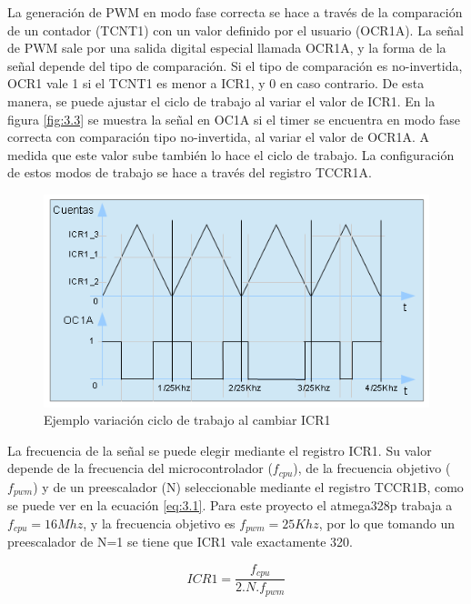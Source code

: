 La generación de PWM en modo fase correcta se hace a través de la comparación de un contador (TCNT1) con un valor definido por el usuario (OCR1A). La señal de PWM sale por una salida digital especial llamada OCR1A, y la forma de la señal depende del tipo de comparación. Si el tipo de comparación es no-invertida, OCR1 vale 1 si el TCNT1 es menor a ICR1, y 0 en caso contrario. De esta manera, se puede ajustar el ciclo de trabajo al variar el valor de ICR1. En la figura \ref{fig:3.3} se muestra la señal en OC1A si el timer se encuentra en modo fase correcta con comparación tipo no-invertida, al variar el valor de OCR1A. A medida que este valor sube también lo hace el ciclo de trabajo. La configuración de estos modos de trabajo se hace a través del registro TCCR1A.

\begin{figure}[!ht]
	\centering
	\includegraphics[width=15cm,scale=1]{resources/3_3-generacionPWM.png}
	\caption{Ejemplo variación ciclo de trabajo al cambiar ICR1}
	\label{fig:\thefigure}
\end{figure}

La frecuencia de la señal se puede elegir mediante el registro ICR1. Su valor depende de la frecuencia del microcontrolador (\(f_{cpu}\)), de la frecuencia objetivo (\(f_{pwm}\)) y de un preescalador (N) seleccionable mediante el registro TCCR1B, como se puede ver en la ecuación \ref{eq:3.1}. Para este proyecto el atmega328p trabaja a \(f_{cpu} = 16Mhz\), y la frecuencia objetivo es \(f_{pwm} = 25Khz\), por lo que tomando un preescalador de N=1 se tiene que ICR1 vale exactamente 320.

\begin{equation} \label{eq:\theequation}
	ICR1 = \frac{f_{cpu}}{2.N.f_{pwm}}
\end{equation}



